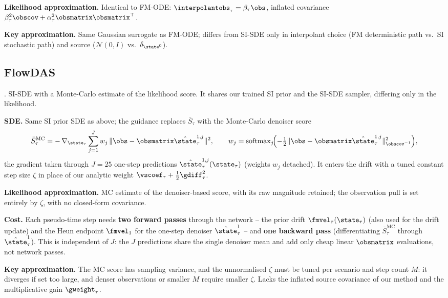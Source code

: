 \textbf{Likelihood approximation.}
Identical to FM-ODE: $\interpolantobs_\tau=\beta_\tau\obs$, inflated covariance $\beta_\tau^2\obscov+\alpha_\tau^2\obsmatrix\obsmatrix^\top$.

\textbf{Key approximation.}
Same Gaussian surrogate as FM-ODE; differs from SI-SDE only in interpolant choice (FM deterministic path vs.\ SI stochastic path) and source ($\mathcal{N}(0,I)$ vs.\ $\delta_{\state^0}$).

\subsection{FlowDAS}\label{appendix:method:flowdas}

\cite{chen_flowdas_2025}. SI-SDE with a Monte-Carlo estimate of the likelihood score. It shares our trained SI prior and the SI-SDE sampler, differing only in the likelihood.

\textbf{SDE.}
Same SI prior SDE as above; the guidance replaces $\bar S_\tau$ with the Monte-Carlo denoiser score
\begin{align}
  \bar S_\tau^{\mathrm{MC}}
  = -\,\nabla_{\state_\tau}\sum_{j=1}^{J} w_j\,\|\obs - \obsmatrix\hat{\state}^{1,j}_\tau\|^2,
  \qquad
  w_j=\operatorname{softmax}_j\!\Bigl(-\tfrac12\|\obs-\obsmatrix\hat{\state}^{1,j}_\tau\|_{\obscov^{-1}}^2\Bigr),
\end{align}
the gradient taken through $J=25$ one-step predictions $\hat{\state}^{1,j}_\tau(\state_\tau)$ (weights $w_j$ detached). It enters the drift with a tuned constant step size $\zeta$ in place of our analytic weight $\vscoef_\tau+\tfrac12\gdiff_\tau^2$.

\textbf{Likelihood approximation.}
MC estimate of the denoiser-based score, with its raw magnitude retained; the observation pull is set entirely by $\zeta$, with no closed-form covariance.

\textbf{Cost.}
Each pseudo-time step needs \textbf{two forward passes} through the network -- the prior drift $\fmvel_\tau(\state_\tau)$ (also used for the drift update) and the Heun endpoint $\fmvel_1$ for the one-step denoiser $\hat{\state}^1_\tau$ -- and \textbf{one backward pass} (differentiating $\bar S_\tau^{\mathrm{MC}}$ through $\hat{\state}^1_\tau$). This is independent of $J$: the $J$ predictions share the single denoiser mean and add only cheap linear $\obsmatrix$ evaluations, not network passes.

\textbf{Key approximation.}
The MC score has sampling variance, and the unnormalised $\zeta$ must be tuned per scenario and step count $M$: it diverges if set too large, and denser observations or smaller $M$ require smaller $\zeta$. Lacks the inflated source covariance of our method and the multiplicative gain $\gweight_\tau$.


